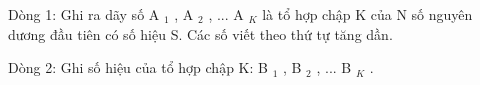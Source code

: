 Dòng 1: Ghi ra dãy số A $_ 1 $ , A $_ 2 $ , ... A $_ K $ là tổ hợp chập K của N số nguyên dương đầu tiên có số hiệu S. Các số viết theo thứ tự tăng dần.

Dòng 2: Ghi số hiệu của tổ hợp chập K: B $_ 1 $ , B $_ 2 $ , ... B $_ K $ .